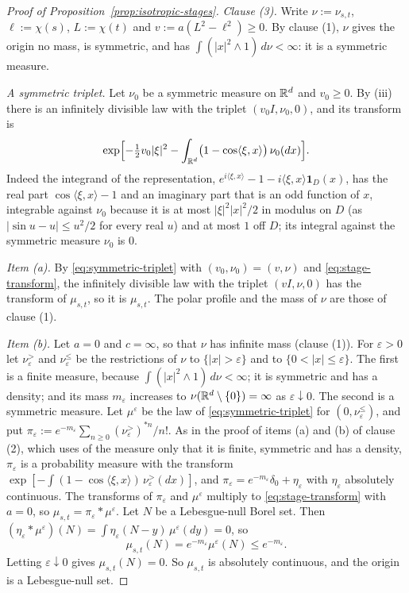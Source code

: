 \begin{proof}[Proof of Proposition~\ref{prop:isotropic-stages}]
\emph{Clause (3).} Write $\nu := \nu_{s,t}$, $\ell := \chi(s)$, $L := \chi(t)$ and $v := a(L^2 - \ell^2) \ge 0$. By
clause (1), $\nu$ gives the origin no mass, is symmetric, and has
$\int(|x|^2 \wedge 1)\,d\nu < \infty$: it is a symmetric \Levy{} measure.

\emph{A symmetric triplet.} Let $\nu_0$ be a symmetric \Levy{} measure on $\mathbb{R}^d$ and
$v_0 \ge 0$. By (iii) there is an infinitely divisible law with the triplet
$(v_0I, \nu_0, 0)$, and its transform is
\begin{equation}\label{eq:symmetric-triplet}
  \exp\Bigl[-\tfrac12 v_0|\xi|^2 - \int_{\mathbb{R}^d}\bigl(1 - \cos\langle\xi,x\rangle\bigr)\,\nu_0(dx)\Bigr] .
\end{equation}
Indeed the integrand of the representation, $e^{i\langle\xi,x\rangle} - 1
- i\langle\xi,x\rangle\mathbf 1_D(x)$, has the real part $\cos\langle\xi,x\rangle - 1$ and an
imaginary part that is an odd function of $x$, integrable against $\nu_0$ because it is at most
$|\xi|^2|x|^2/2$ in modulus on $D$ (as $|\sin u - u| \le u^2/2$ for every real $u$) and at most
$1$ off $D$; its integral against the symmetric
measure $\nu_0$ is $0$.

\emph{Item (a).} By \ref{eq:symmetric-triplet} with $(v_0,\nu_0) = (v,\nu)$ and
\ref{eq:stage-transform}, the infinitely divisible law with the triplet $(vI, \nu, 0)$ has the
transform of $\mu_{s,t}$, so it is $\mu_{s,t}$. The polar profile and the mass of $\nu$ are
those of clause (1).

\emph{Item (b).} Let $a = 0$ and $c = \infty$, so that $\nu$ has infinite mass
(clause (1)). For $\varepsilon > 0$ let $\nu^{>}_\varepsilon$ and
$\nu^{\le}_\varepsilon$ be the restrictions of $\nu$ to $\{|x| > \varepsilon\}$ and to
$\{0 < |x| \le \varepsilon\}$. The first is a finite measure, because
$\int(|x|^2 \wedge 1)\,d\nu < \infty$; it is symmetric and has a density; and its mass
$m_\varepsilon$ increases to $\nu(\mathbb{R}^d \setminus \{0\}) = \infty$ as $\varepsilon \downarrow 0$.
The second is a symmetric \Levy{} measure. Let $\mu^\varepsilon$ be the law of
\ref{eq:symmetric-triplet} for $(0, \nu^{\le}_\varepsilon)$, and put
$\pi_\varepsilon := e^{-m_\varepsilon}\sum_{n \ge 0}(\nu^{>}_\varepsilon)^{*n}/n!$. As in the
proof of items (a) and (b) of clause (2), which uses of the measure only that it is
finite, symmetric and has a density, $\pi_\varepsilon$ is a probability measure with the
transform $\exp[-\int(1 - \cos\langle\xi,x\rangle)\,\nu^{>}_\varepsilon(dx)]$, and
$\pi_\varepsilon = e^{-m_\varepsilon}\delta_0 + \eta_\varepsilon$ with $\eta_\varepsilon$
absolutely continuous. The transforms of $\pi_\varepsilon$ and $\mu^\varepsilon$ multiply to
\ref{eq:stage-transform} with $a = 0$, so $\mu_{s,t} = \pi_\varepsilon * \mu^\varepsilon$. Let
$N$ be a Lebesgue-null Borel set. Then
$(\eta_\varepsilon * \mu^\varepsilon)(N) = \int\eta_\varepsilon(N - y)\,\mu^\varepsilon(dy) = 0$,
so
\[
  \mu_{s,t}(N) = e^{-m_\varepsilon}\mu^\varepsilon(N) \le e^{-m_\varepsilon} .
\]
Letting $\varepsilon \downarrow 0$ gives $\mu_{s,t}(N) = 0$. So $\mu_{s,t}$ is absolutely
continuous, and the origin is a Lebesgue-null set.


\end{proof}
